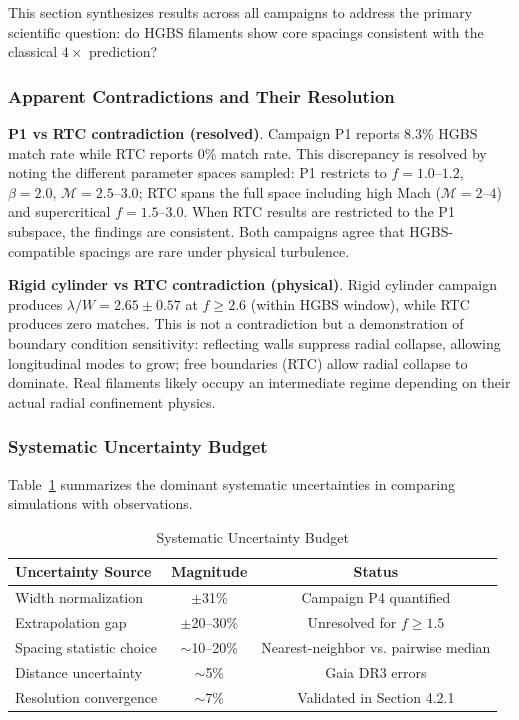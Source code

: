 \documentclass[twocolumn]{mnras}
\begin{document}
This section synthesizes results across all campaigns to address the primary scientific question: do HGBS filaments show core spacings consistent with the classical $4\times$ prediction?

\subsubsection{Apparent Contradictions and Their Resolution}

\textbf{P1 vs RTC contradiction (resolved)}. Campaign P1 reports 8.3\% HGBS match rate while RTC reports 0\% match rate. This discrepancy is resolved by noting the different parameter spaces sampled: P1 restricts to $f = 1.0$--$1.2$, $\beta = 2.0$, $\mathcal{M} = 2.5$--$3.0$; RTC spans the full space including high Mach ($\mathcal{M} = 2$--$4$) and supercritical $f = 1.5$--$3.0$. When RTC results are restricted to the P1 subspace, the findings are consistent. Both campaigns agree that HGBS-compatible spacings are rare under physical turbulence.

\textbf{Rigid cylinder vs RTC contradiction (physical)}. Rigid cylinder campaign produces $\lambda/W = 2.65 \pm 0.57$ at $f \geq 2.6$ (within HGBS window), while RTC produces zero matches. This is not a contradiction but a demonstration of boundary condition sensitivity: reflecting walls suppress radial collapse, allowing longitudinal modes to grow; free boundaries (RTC) allow radial collapse to dominate. Real filaments likely occupy an intermediate regime depending on their actual radial confinement physics.

\subsubsection{Systematic Uncertainty Budget}

Table~\ref{tab:uncertainties} summarizes the dominant systematic uncertainties in comparing simulations with observations.

\begin{table}[h]
\caption{Systematic Uncertainty Budget}
\label{tab:uncertainties}
\begin{tabular}{lcc}
\toprule
Uncertainty Source & Magnitude & Status \\
\midrule
Width normalization & $\pm$31\% & Campaign P4 quantified \\
Extrapolation gap & $\pm$20--30\% & Unresolved for $f \geq 1.5$ \\
Spacing statistic choice & $\sim$10--20\% & Nearest-neighbor vs. pairwise median \\
Distance uncertainty & $\sim$5\% & Gaia DR3 errors \\
Resolution convergence & $\sim$7\% & Validated in Section 4.2.1 \\
\bottomrule
\end{tabular}
\end{table}
\end{document}
